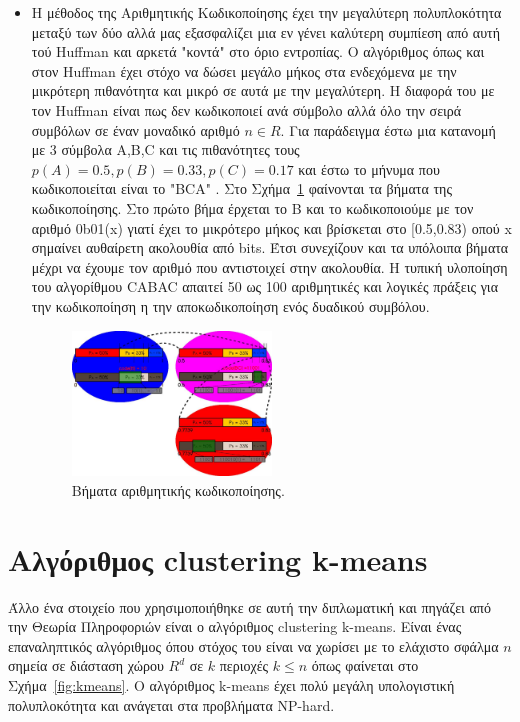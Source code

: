 \begin{itemize}
\newpage
  \item Η μέθοδος της Αριθμητικής Κωδικοποίησης έχει την μεγαλύτερη πολυπλοκότητα μεταξύ των δύο αλλά μας εξασφαλίζει μια εν γένει καλύτερη συμπίεση από αυτή τού Huffman και αρκετά "κοντά" στο όριο εντροπίας. Ο αλγόριθμος όπως και στον Huffman έχει στόχο να δώσει μεγάλο μήκος στα ενδεχόμενα με την μικρότερη πιθανότητα και μικρό σε αυτά με την μεγαλύτερη. Η διαφορά του με τον Huffman είναι πως δεν κωδικοποιεί ανά σύμβολο αλλά όλο την σειρά συμβόλων σε έναν μοναδικό αριθμό $n \in R$. Για παράδειγμα έστω μια κατανομή με 3 σύμβολα A,B,C και τις πιθανότητες τους $ p(A) = 0.5, p(B) = 0.33, p(C) = 0.17 $ και έστω το μήνυμα που κωδικοποιείται είναι το "BCA" . Στο Σχήμα~\ref{fig:ac} φαίνονται τα βήματα της κωδικοποίησης. Στο πρώτο βήμα έρχεται το B και το κωδικοποιούμε με τον αριθμό 0b01(x) γιατί έχει το μικρότερο μήκος και βρίσκεται στο [0.5,0.83) οπού x σημαίνει αυθαίρετη ακολουθία από bits. Έτσι συνεχίζουν και τα υπόλοιπα βήματα μέχρι να έχουμε τον αριθμό που αντιστοιχεί στην ακολουθία. Η τυπική υλοποίηση του αλγορίθμου CABAC απαιτεί 50 ως 100 αριθμητικές και λογικές πράξεις για την κωδικοποίηση η την αποκωδικοποίηση ενός δυαδικού συμβόλου.

      \begin{figure}[ht!]
          \centering
          \includegraphics[width=0.5\textwidth]{chapter3/ac.jpg}
          \caption{Βήματα αριθμητικής κωδικοποίησης. \cite{wiki:arcod}}
          \label{fig:ac}
      \end{figure}
\end{itemize}

\newpage
\section{Αλγόριθμος clustering k-means}
\label{section:sect34}

\indent Άλλο ένα στοιχείο που χρησιμοποιήθηκε σε αυτή την διπλωματική και πηγάζει από την Θεωρία Πληροφοριών είναι ο αλγόριθμος clustering k-means. Είναι ένας επαναληπτικός αλγόριθμος όπου στόχος του είναι να χωρίσει με το ελάχιστο σφάλμα $n$ σημεία σε διάσταση χώρου $R^d$ σε $k$ περιοχές $ k \leq n $ όπως φαίνεται στο Σχήμα~\ref{fig:kmeans}. O αλγόριθμος k-means έχει πολύ μεγάλη υπολογιστική πολυπλοκότητα και ανάγεται στα προβλήματα NP-hard.

